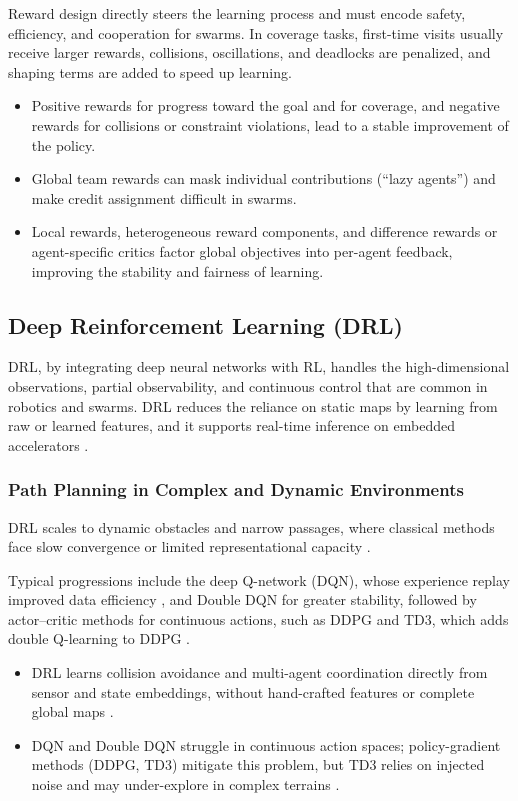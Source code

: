 Reward design directly steers the learning process and must encode safety,
efficiency, and cooperation for swarms. In coverage tasks, first-time visits
usually receive larger rewards, collisions, oscillations, and deadlocks are
penalized, and shaping terms are added to speed up learning.
\begin{itemize}
  \item {} Positive rewards for progress toward the goal
        and for coverage, and negative rewards for collisions or constraint
        violations, lead to a stable improvement of the policy.
  \item {} Global team rewards can mask individual
        contributions (``lazy agents'') and make credit assignment difficult in
        swarms.
  \item {} Local rewards, heterogeneous reward components, and
        difference rewards or agent-specific critics factor global objectives
        into per-agent feedback, improving the stability and fairness of
        learning.
\end{itemize}

\subsection{Deep Reinforcement Learning (DRL)}

DRL, by integrating deep neural networks with RL, handles the high-dimensional
observations, partial observability, and continuous control that are common in
robotics and swarms. DRL reduces the reliance on static maps by learning from raw
or learned features, and it supports real-time inference on embedded
accelerators \cite{zhang2025deep}.

\subsubsection{Path Planning in Complex and Dynamic Environments}

DRL scales to dynamic obstacles and narrow passages, where classical methods face
slow convergence or limited representational capacity \cite{zhang2025deep}.

Typical progressions include the deep Q-network (DQN), whose experience replay
improved data efficiency \cite{mnih2015human}, and Double DQN for greater
stability, followed by actor--critic methods for continuous actions, such as DDPG
and TD3, which adds double Q-learning to DDPG \cite{zhang2025deep,fujimoto2018addressing}.
\begin{itemize}
  \item {} DRL learns collision avoidance and multi-agent
        coordination directly from sensor and state embeddings, without
        hand-crafted features or complete global maps \cite{huttenrauch2019deep}.
  \item {} DQN and Double DQN struggle in
        continuous action spaces; policy-gradient methods (DDPG, TD3) mitigate
        this problem, but TD3 relies on injected noise and may under-explore in
        complex terrains \cite{zhang2025deep}.
\end{itemize}

